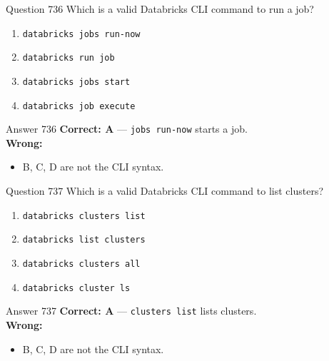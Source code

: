 \documentclass[aspectratio=169,11pt]{beamer}
\begin{document}
	\begin{frame}{Question 736}
		Which is a valid Databricks CLI command to run a job?
		\begin{enumerate}[label=\Alph*.]
			\item \texttt{databricks jobs run-now}
			\item \texttt{databricks run job}
			\item \texttt{databricks jobs start}
			\item \texttt{databricks job execute}
		\end{enumerate}
	\end{frame}
	\begin{frame}{Answer 736}
		\textbf{Correct: A} --- \texttt{jobs run-now} starts a job.\\
		\vspace{0.5em}
		\textbf{Wrong:}
		\begin{itemize}
			\item B, C, D are not the CLI syntax.
		\end{itemize}
	\end{frame}
	
	\begin{frame}{Question 737}
		Which is a valid Databricks CLI command to list clusters?
		\begin{enumerate}[label=\Alph*.]
			\item \texttt{databricks clusters list}
			\item \texttt{databricks list clusters}
			\item \texttt{databricks clusters all}
			\item \texttt{databricks cluster ls}
		\end{enumerate}
	\end{frame}
	\begin{frame}{Answer 737}
		\textbf{Correct: A} --- \texttt{clusters list} lists clusters.\\
		\vspace{0.5em}
		\textbf{Wrong:}
		\begin{itemize}
			\item B, C, D are not the CLI syntax.
		\end{itemize}
	\end{frame}
	
\end{document}

